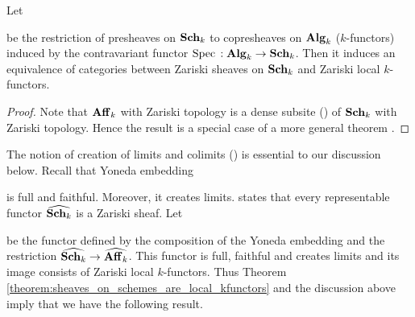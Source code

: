 \begin{theorem}\label{theorem:sheaves_on_schemes_are_local_kfunctors}
Let
\begin{center}
\end{center}
be the restriction of presheaves on $\mathbf{Sch}_k$ to copresheaves on $\mathbf{Alg}_k$ ($k$-functors) induced by the contravariant functor $\mathrm{Spec}\,:\mathbf{Alg}_k\rightarrow \mathbf{Sch}_k$. Then it induces an equivalence of categories between Zariski sheaves on $\mathbf{Sch}_k$ and Zariski local $k$-functors.
\end{theorem}
\begin{proof}
Note that $\mathbf{Aff}_k$ with Zariski topology is a dense subsite ({\cite[definition 4.4]{Sheaves}}) of $\mathbf{Sch}_k$ with Zariski topology. Hence the result is a special case of a more general theorem {\cite[Theorem 4.6]{Sheaves}}. 
\end{proof}
The notion of creation of limits and colimits ({\cite[Definition on page 112]{Maclane}}) is essential to our discussion below. Recall that Yoneda embedding
\begin{center}
\end{center}
is full and faithful. Moreover, it creates limits. {\cite[Proposition 8.8]{gortz2010algebraic}} states that every representable functor $\widehat{\mathbf{Sch}_k}$ is a Zariski sheaf. Let
\begin{center}
\end{center}
be the functor defined by the composition of the Yoneda embedding and the restriction $\widehat{\mathbf{Sch}_k}\rightarrow \widehat{\mathbf{Aff}_k}$. This functor is full, faithful and creates limits and its image consists of Zariski local $k$-functors. Thus Theorem \ref{theorem:sheaves_on_schemes_are_local_kfunctors} and the discussion above imply that we have the following result.

